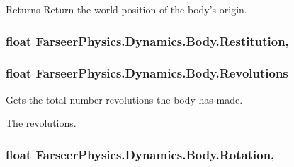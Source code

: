 \begin{DoxyReturn}{Returns}
Return the world position of the body's origin.
\end{DoxyReturn}
\hypertarget{class_farseer_physics_1_1_dynamics_1_1_body_a756747715ac4eaa40ab91f2912faa773}{
\subsubsection[{Restitution}]{\setlength{\rightskip}{0pt plus 5cm}float Farseer\+Physics.\+Dynamics.\+Body.\+Restitution\hspace{0.3cm}{\ttfamily [get]}, {\ttfamily [set]}}}\label{class_farseer_physics_1_1_dynamics_1_1_body_a756747715ac4eaa40ab91f2912faa773}
\hypertarget{class_farseer_physics_1_1_dynamics_1_1_body_a361a74c6501d8cf5b4a176bfed815cfe}{
\subsubsection[{Revolutions}]{\setlength{\rightskip}{0pt plus 5cm}float Farseer\+Physics.\+Dynamics.\+Body.\+Revolutions\hspace{0.3cm}{\ttfamily [get]}}}\label{class_farseer_physics_1_1_dynamics_1_1_body_a361a74c6501d8cf5b4a176bfed815cfe}


Gets the total number revolutions the body has made. 

The revolutions.\hypertarget{class_farseer_physics_1_1_dynamics_1_1_body_a1d6da6608037dec385cae198b6c3f356}{
\subsubsection[{Rotation}]{\setlength{\rightskip}{0pt plus 5cm}float Farseer\+Physics.\+Dynamics.\+Body.\+Rotation\hspace{0.3cm}{\ttfamily [get]}, {\ttfamily [set]}}}\label{class_farseer_physics_1_1_dynamics_1_1_body_a1d6da6608037dec385cae198b6c3f356}


